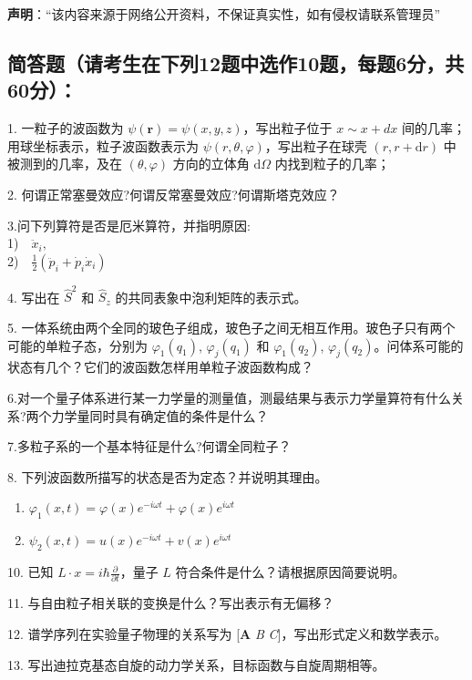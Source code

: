 
\textbf{声明}：“该内容来源于网络公开资料，不保证真实性，如有侵权请联系管理员”

\subsection{简答题（请考生在下列12题中选作10题，每题6分，共60分）：}

1. 一粒子的波函数为 $\psi (\mathbf{r}) = \psi (x, y, z)$，写出粒子位于 $x \sim x + d x$ 间的几率；用球坐标表示，粒子波函数表示为 $\psi (r, \theta, \varphi)$，写出粒子在球壳 $(r, r + \mathrm{d}r)$ 中被测到的几率，及在 $(\theta, \varphi)$ 方向的立体角 $\mathrm{d}\Omega$ 内找到粒子的几率；

2. 何谓正常塞曼效应?何谓反常塞曼效应?何谓斯塔克效应？

3.问下列算符是否是厄米算符，并指明原因:\\
1)$\quad \ddot{x}_i,$\\ 2)$\quad \frac{1}{2}(\ddot{p}_i + \dot{p}_i \dot{x}_i)$

4. 写出在 $\hat{S}^2$ 和 $\hat{S}_z$ 的共同表象中泡利矩阵的表示式。

5. 一体系统由两个全同的玻色子组成，玻色子之间无相互作用。玻色子只有两个可能的单粒子态，分别为 $\varphi_1(q_1)$, $\varphi_j(q_1)$ 和 $\varphi_1(q_2)$, $\varphi_j(q_2)$。问体系可能的状态有几个？它们的波函数怎样用单粒子波函数构成？

6.对一个量子体系进行某一力学量的测量值，测最结果与表示力学量算符有什么关系?两个力学量同时具有确定值的条件是什么？

7.多粒子系的一个基本特征是什么?何谓全同粒子？

8. 下列波函数所描写的状态是否为定态？并说明其理由。

\begin{enumerate}
  \item $\varphi_1 (x, t) = \varphi (x) e^{-i \omega t} + \varphi (x) e^{i \omega t}$
  \item $\psi_2 (x, t) = u (x) e^{-i \omega t} + v (x) e^{i \omega t}$
\end{enumerate}

10. 已知 $L \cdot x = i \hbar \frac{\partial}{\partial t}$，量子 $L$ 符合条件是什么？请根据原因简要说明。

11. 与自由粒子相关联的变换是什么？写出表示有无偏移？

12. 谱学序列在实验量子物理的关系写为 [\textbf{A} \textit{B} \textit{C}]，写出形式定义和数学表示。

13. 写出迪拉克基态自旋的动力学关系，目标函数与自旋周期相等。
